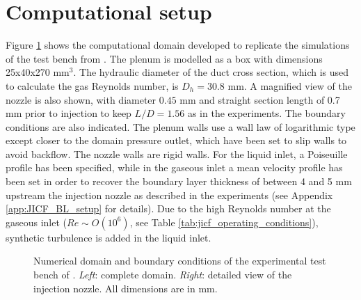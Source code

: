 \section{Computational setup}
	\label{sec:computational_setup}


Figure \ref{fig:numerical_setup_maquette_JICF_DLR} shows the computational domain developed to replicate the simulations of the test bench from . The plenum is modelled as a box with dimensions 25x40x270 mm$^3$. The hydraulic diameter of the duct cross section, which is used to calculate the gas Reynolds number, is $D_h = 30.8$ mm. A magnified view of the nozzle is also shown, with diameter $0.45$ mm and straight section length of 0.7 mm prior to injection to keep $L/D = 1.56$ as in the experiments. The boundary conditions are also indicated. The plenum walls use a wall law of logarithmic type except closer to the domain pressure outlet, which have been set to slip walls to avoid backflow. The nozzle walls are rigid walls. For the liquid inlet, a Poiseuille profile has been specified, while in the gaseous inlet a mean velocity profile has been set in order to recover the boundary layer thickness of between 4 and 5 mm upstream the injection nozzle as described in the experiments (see Appendix \ref{app:JICF_BL_setup} for details). Due to the high Reynolds number at the gaseous inlet ($Re \sim O \left( 10^6 \right)$, see Table \ref{tab:jicf_operating_conditions}), synthetic turbulence is added in the liquid inlet.

\begin{figure}[ht]
     \centering
      \caption{Numerical domain and boundary conditions of the experimental test bench of . \textsl{Left}: complete domain. \textsl{Right}: detailed view of the injection nozzle. All dimensions are in mm.}
      \label{fig:numerical_setup_maquette_JICF_DLR}
\end{figure}


